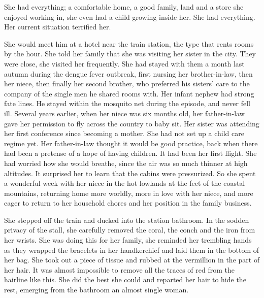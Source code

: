 \documentclass{article}
\begin{document}
She had everything; a comfortable home, a good family, land and a store she enjoyed working in, she even had a child growing inside her. She had everything. Her current situation terrified her.

She would meet him at a hotel near the train station, the type that rents rooms by the hour. She told her family that she was visiting her sister in the city. They were close, she visited her frequently. She had stayed with them a month last autumn during the dengue fever outbreak, first nursing her brother-in-law, then her niece, then finally her second brother, who preferred his sisters' care to the company of the single men he shared rooms with. Her infant nephew had strong fate lines. He stayed within the mosquito net during the episode, and never fell ill. Several years earlier, when her niece was six months old, her father-in-law gave her permission to fly across the country to baby sit. Her sister was attending her first conference since becoming a mother. She had not set up a child care regime yet. Her father-in-law thought it would be good practice, back when there had been a pretense of a hope of having children. It had been her first flight. She had worried how she would breathe, since the air was so much thinner at high altitudes. It surprised her to learn that the cabins were pressurized. So she spent a wonderful week with her niece in the hot lowlands at the feet of the coastal mountains, returning home more worldly, more in love with her niece, and more eager to return to her household chores and her position in the family business.

She stepped off the train and ducked into the station bathroom. In the sodden privacy of the stall, she carefully removed the coral, the conch and the iron from her wrists. She was doing this for her family, she reminded her trembling hands as they wrapped the bracelets in her handkerchief and laid them in the bottom of her bag. She took out a piece of tissue and rubbed at the vermillion in the part of her hair. It was almost impossible to remove all the traces of red from the hairline like this. She did the best she could and reparted her hair to hide the rest,  emerging from the bathroom an almost single woman.
\end{document}
